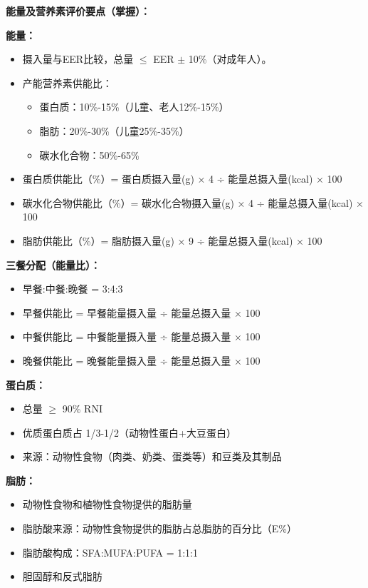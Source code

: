 \begin{keybox}
\textbf{能量及营养素评价要点（掌握）：}

\textbf{能量：}
\begin{itemize}[leftmargin=*]
    \item 摄入量与EER比较，总量 $\le$ EER $\pm$ 10\%（对成年人）。
    \item 产能营养素供能比：
    \begin{itemize}
        \item 蛋白质：10\%-15\%（儿童、老人12\%-15\%）
        \item 脂肪：20\%-30\%（儿童25\%-35\%）
        \item 碳水化合物：50\%-65\%
    \end{itemize}
    \item 蛋白质供能比（\%）= 蛋白质摄入量(g) × 4 ÷ 能量总摄入量(kcal) × 100
    \item 碳水化合物供能比（\%）= 碳水化合物摄入量(g) × 4 ÷ 能量总摄入量(kcal) × 100
    \item 脂肪供能比（\%）= 脂肪摄入量(g) × 9 ÷ 能量总摄入量(kcal) × 100
\end{itemize}

\textbf{三餐分配（能量比）：}
\begin{itemize}[leftmargin=*]
    \item 早餐:中餐:晚餐 = 3:4:3
    \item 早餐供能比 = 早餐能量摄入量 ÷ 能量总摄入量 × 100
    \item 中餐供能比 = 中餐能量摄入量 ÷ 能量总摄入量 × 100
    \item 晚餐供能比 = 晚餐能量摄入量 ÷ 能量总摄入量 × 100
\end{itemize}

\textbf{蛋白质：}
\begin{itemize}[leftmargin=*]
    \item 总量 $\ge$ 90\% RNI
    \item 优质蛋白质占 1/3-1/2（动物性蛋白+大豆蛋白）
    \item 来源：动物性食物（肉类、奶类、蛋类等）和豆类及其制品
\end{itemize}

\textbf{脂肪：}
\begin{itemize}[leftmargin=*]
    \item 动物性食物和植物性食物提供的脂肪量
    \item 脂肪酸来源：动物性食物提供的脂肪占总脂肪的百分比（E\%）
    \item 脂肪酸构成：SFA:MUFA:PUFA = 1:1:1
    \item 胆固醇和反式脂肪
\end{itemize}


\end{keybox}
